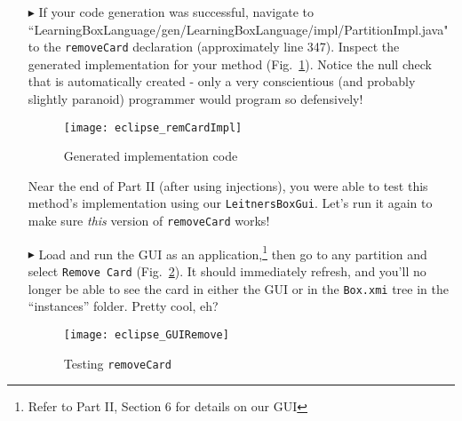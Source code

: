 \begin{itemize}

\item[$\blacktriangleright$] If your code generation was successful, navigate to
``Learning\-Box\-Language/\-gen/\-Learning\-Box\-Language/\-impl/\-Partition\-Impl.java" to the \texttt{\-remove\-Card} declaration (approximately line 347).
Inspect the generated implementation for your method (Fig.~\ref{eclipse:remCardImpl}). Notice the null check that is automatically created - only a very
conscientious (and probably slightly paranoid) programmer would program so defensively!

\vspace{0.5cm}

\begin{figure}[htp]
\begin{center}
  \texttt{[image: eclipse\_remCardImpl]}
  \caption{Generated implementation code}
  \label{eclipse:remCardImpl}
\end{center}
\end{figure}

\newpage

Near the end of Part II (after using injections), you were able to test this method's implementation using our \texttt{LeitnersBoxGui}. Let's run it again to
make sure \emph{this} version of \texttt{removeCard} works!

\item[$\blacktriangleright$] Load and run the GUI as an application,\footnote{Refer to Part II, Section 6 for details on our GUI} then go to any partition and
select \texttt{Remove Card} (Fig.~\ref{eclipse:GUIRemCard}).
It should immediately refresh, and you'll no longer be able to see the card in either the GUI or in the \texttt{Box.xmi} tree in the ``instances'' folder.
Pretty cool, eh?

\vspace{1cm}

\begin{figure}[htp]
\begin{center}
  \texttt{[image: eclipse\_GUIRemove]}
  \caption{Testing \texttt{removeCard}}
  \label{eclipse:GUIRemCard}
\end{center}
\end{figure}

\end{itemize}